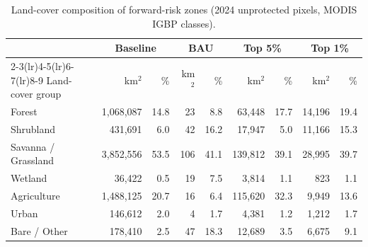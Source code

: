 \begin{table}[htbp]
  \centering
  \small
  \caption{Land-cover composition of forward-risk zones (2024 unprotected pixels, MODIS IGBP classes).}
  \label{tab:landcover_exposure}
  \begin{tabular}{lrrrrrrrr}
    \toprule
    & \multicolumn{2}{c}{Baseline} & \multicolumn{2}{c}{BAU} & \multicolumn{2}{c}{Top 5\%} & \multicolumn{2}{c}{Top 1\%} \\
    \cmidrule(lr){2-3}\cmidrule(lr){4-5}\cmidrule(lr){6-7}\cmidrule(lr){8-9}
    Land-cover group & km$^2$ & \% & km$^2$ & \% & km$^2$ & \% & km$^2$ & \% \\
    \midrule
    Forest & 1,068,087 & 14.8 & 23 & 8.8 & 63,448 & 17.7 & 14,196 & 19.4 \\
    Shrubland & 431,691 & 6.0 & 42 & 16.2 & 17,947 & 5.0 & 11,166 & 15.3 \\
    Savanna / Grassland & 3,852,556 & 53.5 & 106 & 41.1 & 139,812 & 39.1 & 28,995 & 39.7 \\
    Wetland & 36,422 & 0.5 & 19 & 7.5 & 3,814 & 1.1 & 823 & 1.1 \\
    Agriculture & 1,488,125 & 20.7 & 16 & 6.4 & 115,620 & 32.3 & 9,949 & 13.6 \\
    Urban & 146,612 & 2.0 & 4 & 1.7 & 4,381 & 1.2 & 1,212 & 1.7 \\
    Bare / Other & 178,410 & 2.5 & 47 & 18.3 & 12,689 & 3.5 & 6,675 & 9.1 \\
    \bottomrule
  \end{tabular}
\end{table}
